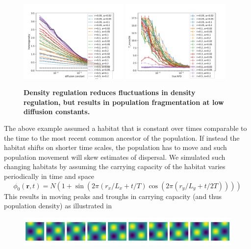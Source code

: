 \documentclass[aps,rmp, onecolumn]{revtex4}
\newcommand{\rvec}{\mathbf{r}}
\begin{document}
\begin{figure}
    \includegraphics[width=0.48\textwidth]{figures/density_reg_heterogeneity.pdf}
    \includegraphics[width=0.48\textwidth]{figures/density_reg_tmrca.pdf}
    \caption{\label{fig:density_reg} {\bf Density regulation reduces fluctuations in density regulation, but results in population fragmentation at low diffusion constants.}}
\end{figure}

The above example assumed a habitat that is constant over times comparable to the time to the most recent common ancestor of the population.
If instead the habitat shifts on shorter time scales, the population has to move and such population movement will skew estimates of dispersal.
We simulated such changing habitats by assuming the carrying capacity of the habitat varies periodically in time and space
\begin{equation}
    \phi_0(\rvec, t) = N\left(1 + \sin(2\pi (r_x/L_x + t/T)\cos(2\pi (r_y/L_y + t/2T))) \right)
\end{equation}
This results in moving peaks and troughs in carrying capacity (and thus population density) as illustrated in

\begin{figure}
    \includegraphics[width=\textwidth]{figures/habitats.png}
    \caption{\label{fig:moving_habitats}}
\end{figure}



\end{document}
